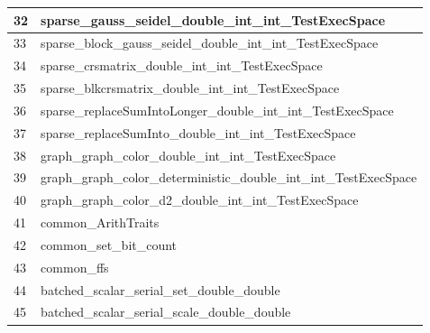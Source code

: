 \begin{table}[!htbp]
{\begin{tabular}{|>{\columncolor[HTML]{34FF34}}l |l|}
            \cellcolor[HTML]{FF00FF}32 & sparse\_gauss\_seidel\_double\_int\_int\_TestExecSpace              \\ \hline
            \cellcolor[HTML]{FF00FF}33 & sparse\_block\_gauss\_seidel\_double\_int\_int\_TestExecSpace       \\ \hline
            34                         & sparse\_crsmatrix\_double\_int\_int\_TestExecSpace                  \\ \hline
            \cellcolor[HTML]{F8FF00}35 & sparse\_blkcrsmatrix\_double\_int\_int\_TestExecSpace               \\ \hline
            \cellcolor[HTML]{FF00FF}36 & sparse\_replaceSumIntoLonger\_double\_int\_int\_TestExecSpace       \\ \hline
            \cellcolor[HTML]{FF00FF}37 & sparse\_replaceSumInto\_double\_int\_int\_TestExecSpace             \\ \hline
            \cellcolor[HTML]{FF00FF}38 & graph\_graph\_color\_double\_int\_int\_TestExecSpace                \\ \hline
            \cellcolor[HTML]{FF00FF}39 & graph\_graph\_color\_deterministic\_double\_int\_int\_TestExecSpace \\ \hline
            \cellcolor[HTML]{FF00FF}40 & graph\_graph\_color\_d2\_double\_int\_int\_TestExecSpace            \\ \hline
            \cellcolor[HTML]{FF00FF}41 & common\_ArithTraits                                                 \\ \hline
            42                         & common\_set\_bit\_count                                             \\ \hline
            43                         & common\_ffs                                                         \\ \hline
            \cellcolor[HTML]{FE0000}44 & batched\_scalar\_serial\_set\_double\_double                        \\ \hline
            45                         & batched\_scalar\_serial\_scale\_double\_double                      \\ \hline
            \end{tabular}

            \hspace{1cm}

}
\end{table}
